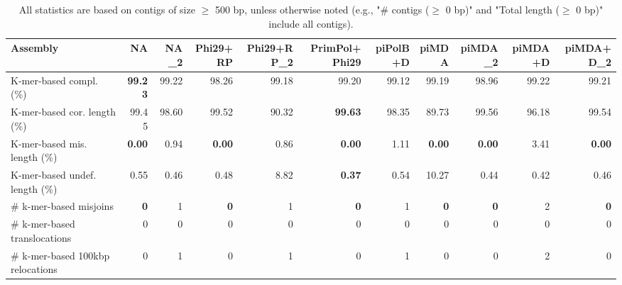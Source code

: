 \documentclass[12pt,a4paper]{article}
\begin{document}
\begin{table}[ht]
\begin{center}
\caption{All statistics are based on contigs of size $\geq$ 500 bp, unless otherwise noted (e.g., "\# contigs ($\geq$ 0 bp)" and "Total length ($\geq$ 0 bp)" include all contigs).}
\begin{tabular}{|l*{10}{|r}|}
\hline
Assembly & NA & NA\_2 & Phi29+RP & Phi29+RP\_2 & PrimPol+Phi29 & piPolB+D & piMDA & piMDA\_2 & piMDA+D & piMDA+D\_2 \\ \hline
K-mer-based compl. (\%) & {\bf 99.23} & 99.22 & 98.26 & 99.18 & 99.20 & 99.12 & 99.19 & 98.96 & 99.22 & 99.21 \\ \hline
K-mer-based cor. length (\%) & 99.45 & 98.60 & 99.52 & 90.32 & {\bf 99.63} & 98.35 & 89.73 & 99.56 & 96.18 & 99.54 \\ \hline
K-mer-based mis. length (\%) & {\bf 0.00} & 0.94 & {\bf 0.00} & 0.86 & {\bf 0.00} & 1.11 & {\bf 0.00} & {\bf 0.00} & 3.41 & {\bf 0.00} \\ \hline
K-mer-based undef. length (\%) & 0.55 & 0.46 & 0.48 & 8.82 & {\bf 0.37} & 0.54 & 10.27 & 0.44 & 0.42 & 0.46 \\ \hline
\# k-mer-based misjoins & {\bf 0} & 1 & {\bf 0} & 1 & {\bf 0} & 1 & {\bf 0} & {\bf 0} & 2 & {\bf 0} \\ \hline
\hspace{5mm}\# k-mer-based translocations & 0 & 0 & 0 & 0 & 0 & 0 & 0 & 0 & 0 & 0 \\ \hline
\hspace{5mm}\# k-mer-based 100kbp relocations & 0 & 1 & 0 & 1 & 0 & 1 & 0 & 0 & 2 & 0 \\ \hline
\end{tabular}
\end{center}
\end{table}
\end{document}
